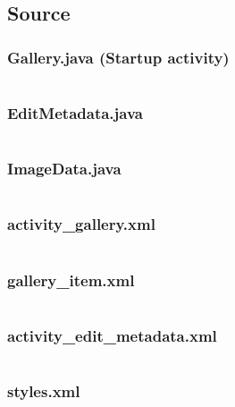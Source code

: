 \documentclass[11pt,english,numbers=endperiod,parskip=half]{scrartcl}
\begin{document}
\begin{landscape}
\subsection{Source}
\subsubsection{Gallery.java (Startup activity)}
\inputminted{java}{../../Apps/Metadata/app/src/main/java/au/net/danielparker/metadata/Gallery.java}

\subsubsection{EditMetadata.java}
\inputminted{java}{../../Apps/Metadata/app/src/main/java/au/net/danielparker/metadata/EditMetadata.java}

\subsubsection{ImageData.java}
\inputminted{java}{../../Apps/Metadata/app/src/main/java/au/net/danielparker/metadata/ImageData.java}

\subsubsection{activity\_gallery.xml}
\inputminted{xml}{../../Apps/Metadata/app/src/main/res/layout/activity_gallery.xml}

\subsubsection{gallery\_item.xml}
\inputminted{xml}{../../Apps/Metadata/app/src/main/res/layout/gallery_item.xml}

\subsubsection{activity\_edit\_metadata.xml}
\inputminted{xml}{../../Apps/Metadata/app/src/main/res/layout/activity_edit_metadata.xml}

\subsubsection{styles.xml}
\inputminted{xml}{../../Apps/Metadata/app/src/main/res/values/styles.xml}
\end{landscape}

\setlength\fboxsep{0pt}
\setlength\fboxrule{0.5pt}
\end{document}
